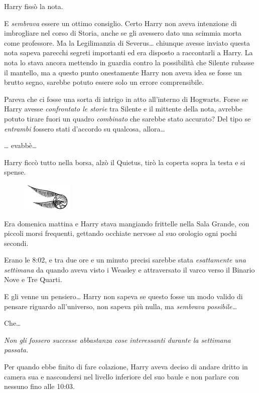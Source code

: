 Harry fissò la nota.

E \textit{sembrava} essere un ottimo consiglio. Certo Harry non aveva intenzione di imbrogliare nel corso di Storia, anche se gli avessero dato una scimmia morta come professore. Ma la Legilimanzia di Severus… chiunque avesse inviato questa nota sapeva parecchi segreti importanti ed era disposto a raccontarli a Harry. La nota lo stava ancora mettendo in guardia contro la possibilità che Silente rubasse il mantello, ma a questo punto onestamente Harry non aveva idea se fosse un brutto segno, sarebbe potuto essere solo un errore comprensibile.

Pareva che ci fosse una sorta di intrigo in atto all’interno di Hogwarts. Forse se Harry avesse \textit{confrontato le storie} tra Silente e il mittente della nota, avrebbe potuto tirare fuori un quadro \textit{combinato} che sarebbe stato accurato? Del tipo se \textit{entrambi} fossero stati d’accordo su qualcosa, allora…

… evabbè…

Harry ficcò tutto nella borsa, alzò il Quietus, tirò la coperta sopra la testa e si spense.

\begin{figure}[h!]
        \includegraphics[scale=0.4]{boccino.png}
        \centering
\end{figure}

Era domenica mattina e Harry stava mangiando frittelle nella Sala Grande, con piccoli morsi frequenti, gettando occhiate nervose al suo orologio ogni pochi secondi.

Erano le 8:02, e tra due ore e un minuto precisi sarebbe stata \textit{esattamente una settimana} da quando aveva visto i Weasley e attraversato il varco verso il Binario Nove e Tre Quarti.

E gli venne un pensiero… Harry non sapeva se questo fosse un modo valido di pensare riguardo all’universo, non sapeva più nulla, ma \textit{sembrava possibile…}

Che…

\textit{Non gli fossero successe abbastanza cose interessanti durante la settimana passata.}

Per quando ebbe finito di fare colazione, Harry aveva deciso di andare dritto in camera sua e nascondersi nel livello inferiore del suo baule e non parlare con nessuno fino alle 10:03.

